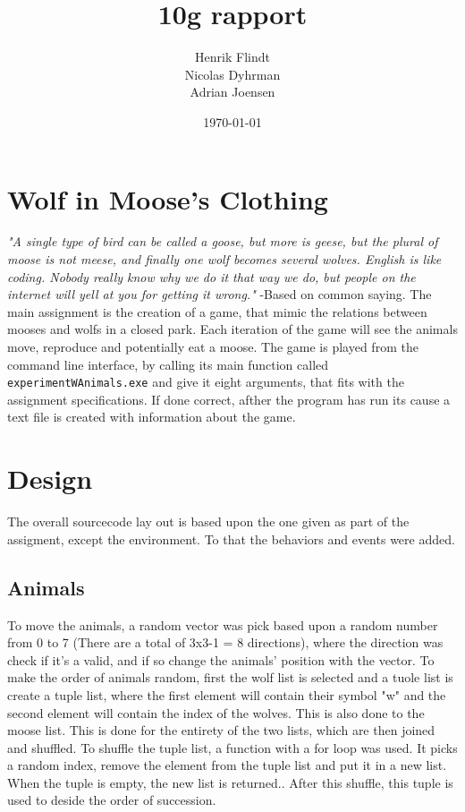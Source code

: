 \documentclass{article}
\title{10g rapport}
\author{Henrik Flindt\\Nicolas Dyhrman\\Adrian Joensen}
\date{\today}
\begin{document}
    \maketitle
    
    \section*{Wolf in Moose's Clothing}
    \textit{"A single type of bird can be called a goose, but more is geese, but the plural of moose is not meese, and finally one wolf becomes several wolves. English is like coding. Nobody really know why we do it that way we do, but people on the internet will yell at you for getting it wrong."} \newline -Based on common saying. \newline \newline
    The main assignment is the creation of a game, that mimic the relations between mooses and wolfs in a closed park. Each iteration of the game will see the animals move, reproduce and potentially eat a moose. The game is played from the command line interface, by calling its main function called \verb|experimentWAnimals.exe| and give it eight arguments, that fits with the assignment specifications. If done correct, afther the program has run its cause a text file is created with information about the game. 


    \section{Design}
    	The overall sourcecode lay out is based upon the one given as part of the assigment, except the environment. To that the behaviors and events were added. 
    	
        \subsection{Animals}	
    	To move the animals, a random vector was pick based upon a random number from 0 to 7 (There are a total of 3x3-1 = 8 directions), where the direction was check if it's a valid, and if so change the animals' position with the vector.\newline
    	To make the order of animals random, first the wolf list is selected and a tuole list is create a tuple list, where the first element will contain their symbol "w" and the second element will contain the index of the wolves. This is also done to the moose list. This is done for the entirety of the two lists, which are then joined and shuffled. \newline To shuffle the tuple list, a function with a for loop was used. It picks a random index, remove the element from the tuple list and put it in a new list. When the tuple is empty, the new list is returned.. After this shuffle, this tuple is used to deside the order of succession. \newline	
\end{document}
